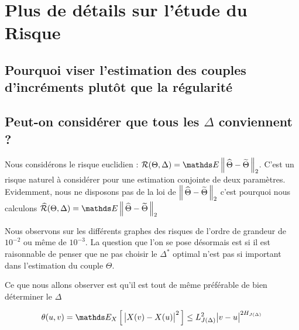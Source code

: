 


\chapter{Plus de détails sur l'étude du Risque}

\minitoc%

\section{Pourquoi viser l'estimation des couples d'incréments plutôt que la régularité}
\label{annexe:choix_risque_couple}


% 


\section{Peut-on considérer que tous les $\Delta$ conviennent ?}
\label{annexe:tous_theta_conviennent_borne_norme_theta}

Nous considérons le risque euclidien : $\mathcal R(\Theta, \Delta) = \mathds E \distnorme 2 {\widehat \Theta}{\widetilde \Theta}$. C'est un risque naturel à considérer pour une estimation conjointe de deux paramètres. Evidemment, nous ne disposons pas de la loi de $\left\lVert \, \widehat \Theta - \widetilde \Theta \, \right\rVert _ {2}$ c'est pourquoi nous calculons $\widehat {\mathcal R}(\Theta, \Delta) = \mathds E \distnorme 2 {\widehat \Theta}{\widetilde \Theta}$

Nous observons sur les différents graphes des risques de l'ordre de grandeur de $10^{-2}$ ou même de $10^{-3}$. La question que l'on se pose désormais est si il est raisonnable de penser que ne pas choisir le $\Delta^*$ optimal n'est pas si important dans l'estimation du couple $\Theta$.

Ce que nous allons observer est qu'il est tout de même préférable de bien déterminer le $\Delta$

\begin{equation}
	\theta(u,v) = \esperanceloi X { \bigl| X(v) - X(u) \bigr|^2 } \leq L_{J(\Delta)}^2 \bigl| v - u \bigr|^{2 H_{J(\Delta)}}
\end{equation}

